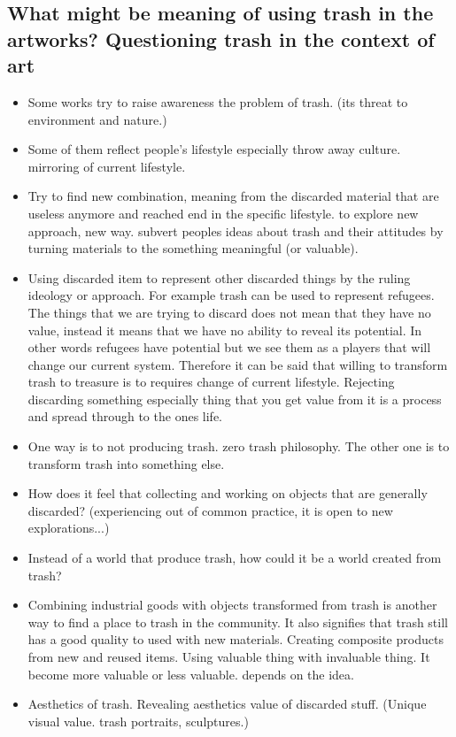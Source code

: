 \documentclass{article}
\begin{document}
\subsection{What might be meaning of using trash in the artworks? Questioning trash in the context of art}
\begin{itemize}
\item Some works try to raise awareness the problem of trash. (its threat to environment and nature.)
\item Some of them reflect people's lifestyle especially throw away culture. mirroring of current lifestyle.
\item Try to find new combination, meaning from the discarded material that are useless anymore and reached end in the specific lifestyle. to explore new approach, new way. subvert peoples ideas about trash and their attitudes by turning materials to the something meaningful (or valuable).
\item Using discarded item to represent other discarded things by the ruling ideology or approach. For example trash can be used to represent refugees. The things that we are trying to discard does not mean that they have no value, instead it means that we have no ability to reveal its potential. In other words refugees have potential but we see them as a players that will change our current system. Therefore it can be said that willing to transform trash to treasure is to requires change of current lifestyle. Rejecting discarding something especially thing that you get value from it is a process and spread through to the ones life.
\item One way is to not producing trash. zero trash philosophy. The other one is to transform trash into something else.
\item How does it feel that collecting and working on objects that are generally discarded? (experiencing out of common practice, it is open to new explorations...)
\item Instead of a world that produce trash, how could it be a world created from trash?
\item Combining industrial goods with objects transformed from trash is another way to find a place to trash in the community. It also signifies that trash still has a good quality to used with new materials. Creating composite products from new and reused items. Using valuable thing with invaluable thing. It become more valuable or less valuable. depends on the idea.
\item Aesthetics of trash. Revealing aesthetics value of discarded stuff. (Unique visual value. trash portraits, sculptures.)
\end{itemize}
\end{document}
